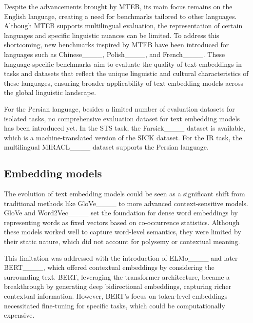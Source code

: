 Despite the advancements brought by MTEB, its main focus remains on the English language, creating a need for benchmarks tailored to other languages. Although MTEB supports multilingual evaluation, the representation of certain languages and specific linguistic nuances can be limited. To address this shortcoming, new benchmarks inspired by MTEB have been introduced for languages such as Chinese____, Polish____, and French____. These language-specific benchmarks aim to evaluate the quality of text embeddings in tasks and datasets that reflect the unique linguistic and cultural characteristics of these languages, ensuring broader applicability of text embedding models across the global linguistic landscape.

For the Persian language, besides a limited number of evaluation datasets for isolated tasks, no comprehensive evaluation dataset for text embedding models has been introduced yet. %
In the STS task, the Farsick____ dataset is available, which is a machine-translated version of the SICK dataset. %
For the IR task, the multilingual MIRACL____ dataset  supports the Persian language. %

\subsection{Embedding models}
The evolution of text embedding models could be seen as a significant shift from traditional methods like GloVe____ to more advanced context-sensitive models. GloVe and Word2Vec____ set the foundation for dense word embeddings by representing words as fixed vectors based on co-occurrence statistics. Although these models worked well to capture word-level semantics, they were limited by their static nature, which did not account for polysemy or contextual meaning.

This limitation was addressed with the introduction of ELMo____ and later BERT____, which offered contextual embeddings by considering the surrounding text. BERT, leveraging the transformer architecture, became a breakthrough by generating deep bidirectional embeddings, capturing richer contextual information. However, BERT's focus on token-level embeddings necessitated fine-tuning for specific tasks, which could be computationally expensive.

